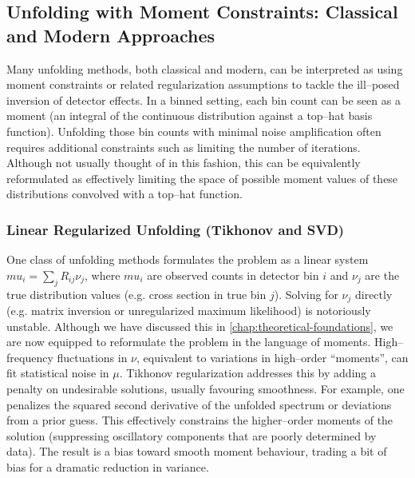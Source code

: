     \subsection{Unfolding with Moment Constraints: Classical and Modern Approaches}
        Many unfolding methods, both classical and modern, can be interpreted as using moment constraints or related regularization assumptions to tackle the ill--posed inversion of detector effects.
        In a binned setting, each bin count can be seen as a moment (an integral of the continuous distribution against a top--hat basis function).
        Unfolding those bin counts with minimal noise amplification often requires additional constraints such as limiting the number of iterations.
        Although not usually thought of in this fashion, this can be equivalently reformulated as effectively limiting the space of possible moment values of these distributions convolved with a top--hat function.
        
        \subsubsection{Linear Regularized Unfolding (Tikhonov and SVD)}
            One class of unfolding methods formulates the problem as a linear system $mu_i = \sum_j R_{ij} \nu_j$, where $mu_i$ are observed counts in detector bin $i$ and $\nu_j$ are the true distribution values (e.g. cross section in true bin $j$).
            Solving for $\nu_j$ directly (e.g. matrix inversion or unregularized maximum likelihood) is notoriously unstable.
            Although we have discussed this in \cref{chap:theoretical-foundations}, we are now equipped to reformulate the problem in the language of moments.
            High--frequency fluctuations in $\nu$, equivalent to variations in high--order “moments”, can fit statistical noise in $\mu$.
            Tikhonov regularization addresses this by adding a penalty on undesirable solutions, usually favouring smoothness.
            For example, one penalizes the squared second derivative of the unfolded spectrum or deviations from a prior guess.
            This effectively constrains the higher--order moments of the solution (suppressing oscillatory components that are poorly determined by data). The result is a bias toward smooth moment behaviour, trading a bit of bias for a dramatic reduction in variance.
            

